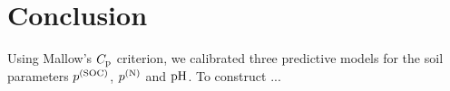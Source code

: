 \section{Conclusion}
\label{sec:conclusion}

	Using Mallow's $C_{\mathrm{p}}$ criterion, we calibrated three predictive models for the soil parameters $p^{(\mathrm{SOC})}$, $p^{(\mathrm{N})}$ and $\mathrm{pH}$.
	To construct ...
	

